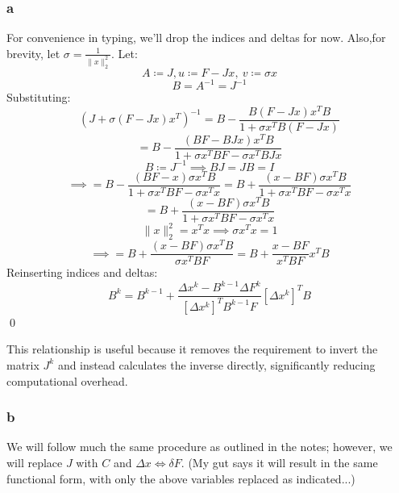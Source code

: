 \documentclass[11pt]{report}
\theoremstyle{definition}
\begin{document}
\subsubsection*{a}
For convenience in typing, we'll drop the indices and deltas for now.
Also,for brevity, let $\sigma = \frac{1}{\|x\|_2^2}$.
Let:
\[A \coloneqq J, u \coloneqq F - Jx,\ v \coloneqq \sigma x\]
\[B = A^{-1} = J^{-1}\]
Substituting:
\[
	(J + \sigma(F-Jx)x^T)^{-1}
	= B - \frac{B(F-Jx)x^TB}{1+\sigma x^TB(F-Jx)}
\]
\[
	= B - \frac{(BF-BJx)x^TB}{1+\sigma x^TBF - \sigma x^TBJx}
\]
\[B \coloneqq J^{-1} \implies BJ = JB = I\]
\[
	\implies
	= B - \frac{(BF-x)\sigma x^TB}{1+\sigma x^TBF - \sigma x^Tx}
	= B + \frac{(x-BF)\sigma x^TB}{1+\sigma x^TBF - \sigma x^Tx}
\]
\[
	= B + \frac{(x-BF)\sigma x^TB}{1+\sigma x^TBF - \sigma x^Tx}
\]
\[\|x\|_2^2 = x^Tx \implies \sigma x^Tx = 1\]
\[
	\implies = B + \frac{(x-BF)\sigma x^TB}{\sigma x^TBF}
	= B + \frac{x-BF}{x^TBF}x^TB
\]
Reinserting indices and deltas:
\[
	B^{k}
	= B^{k-1} + \frac{\Delta x^{k}-B^{k-1}\Delta F^{k}}{ [\Delta x^{k}]^TB^{k-1}F}[\Delta x^{k}]^TB
\]
\qed


This relationship is useful because it removes the requirement to invert the matrix $J^k$
and instead calculates the inverse directly, significantly reducing computational overhead.

\subsubsection*{b}
We will follow much the same procedure as outlined in the notes; however, we
will replace $J$ with $C$ and $\Delta x \iff \delta F$.  (My gut says it will
result in the same functional form, with only the above variables replaced as
indicated...)
\end{document}

